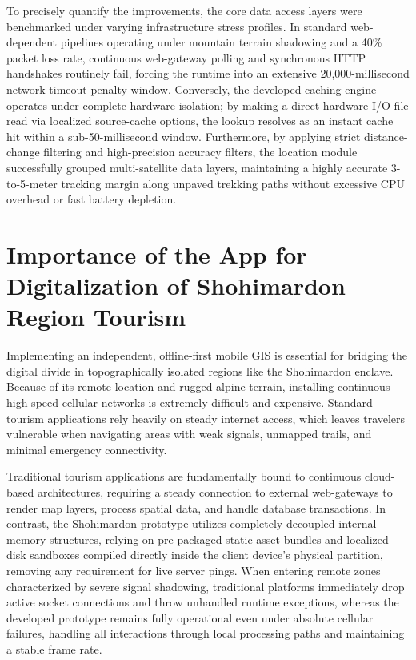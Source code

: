 \documentclass[12pt,a4paper,oneside]{report}
\begin{document}
To precisely quantify the improvements, the core data access layers were benchmarked under
varying infrastructure stress profiles. In standard web-dependent pipelines operating under
mountain terrain shadowing and a 40\% packet loss rate, continuous web-gateway polling and
synchronous HTTP handshakes routinely fail, forcing the runtime into an extensive
20{,}000-millisecond network timeout penalty window. Conversely, the developed caching engine
operates under complete hardware isolation; by making a direct hardware I/O file read via
localized source-cache options, the lookup resolves as an instant cache hit within a
sub-50-millisecond window. Furthermore, by applying strict distance-change filtering and
high-precision accuracy filters, the location module successfully grouped multi-satellite
data layers, maintaining a highly accurate 3-to-5-meter tracking margin along unpaved
trekking paths without excessive CPU overhead or fast battery depletion.

\section{Importance of the App for Digitalization of Shohimardon Region Tourism}

Implementing an independent, offline-first mobile GIS is essential for bridging the digital
divide in topographically isolated regions like the Shohimardon enclave. Because of its
remote location and rugged alpine terrain, installing continuous high-speed cellular
networks is extremely difficult and expensive. Standard tourism applications rely heavily
on steady internet access, which leaves travelers vulnerable when navigating areas with
weak signals, unmapped trails, and minimal emergency connectivity.

Traditional tourism applications are fundamentally bound to continuous cloud-based
architectures, requiring a steady connection to external web-gateways to render map layers,
process spatial data, and handle database transactions. In contrast, the Shohimardon
prototype utilizes completely decoupled internal memory structures, relying on pre-packaged
static asset bundles and localized disk sandboxes compiled directly inside the client
device's physical partition, removing any requirement for live server pings. When entering
remote zones characterized by severe signal shadowing, traditional platforms immediately
drop active socket connections and throw unhandled runtime exceptions, whereas the developed
prototype remains fully operational even under absolute cellular failures, handling all
interactions through local processing paths and maintaining a stable frame rate.
\end{document}
